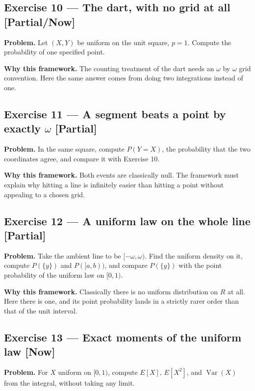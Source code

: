 \documentclass[11pt]{article}
\newcommand{\Var}{\operatorname{Var}}
\begin{document}
\subsection*{Exercise 10 --- The dart, with no grid at all \hfill \normalfont\small[Partial/Now]}

\textbf{Problem.} Let $(X,Y)$ be uniform on the unit square, $p = 1$. Compute the
probability of one specified point.

\textbf{Why this framework.} The counting treatment of the dart needs an
$\omega$ by $\omega$ grid convention. Here the same answer comes from doing two
integrations instead of one.


\subsection*{Exercise 11 --- A segment beats a point by exactly $\omega$ \hfill \normalfont\small[Partial]}

\textbf{Problem.} In the same square, compute $P(Y = X)$, the probability that the
two coordinates agree, and compare it with Exercise 10.

\textbf{Why this framework.} Both events are classically null. The framework must
explain why hitting a line is infinitely easier than hitting a point without
appealing to a chosen grid.


\subsection*{Exercise 12 --- A uniform law on the whole line \hfill \normalfont\small[Partial]}

\textbf{Problem.} Take the ambient line to be $[-\omega, \omega)$. Find the uniform
density on it, compute $P(\{y\})$ and $P([a,b))$, and compare $P(\{y\})$ with the
point probability of the uniform law on $[0,1)$.

\textbf{Why this framework.} Classically there is no uniform distribution on $R$ at
all. Here there is one, and its point probability lands in a strictly rarer
order than that of the unit interval.


\subsection*{Exercise 13 --- Exact moments of the uniform law \hfill \normalfont\small[Now]}

\textbf{Problem.} For $X$ uniform on $[0,1)$, compute $E[X]$, $E[X^2]$, and
$\Var(X)$ from the integral, without taking any limit.
\end{document}
